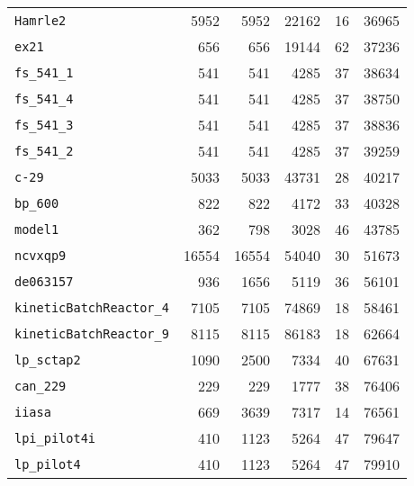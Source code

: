 \begin{table}[p]
\begin{center}
\begin{tabular}{lrrrrr}
\texttt{Hamrle2}&5952&5952&22162&16&36965\\
\texttt{ex21}&656&656&19144&62&37236\\
\texttt{fs\_541\_1}&541&541&4285&37&38634\\
\texttt{fs\_541\_4}&541&541&4285&37&38750\\
\texttt{fs\_541\_3}&541&541&4285&37&38836\\
\texttt{fs\_541\_2}&541&541&4285&37&39259\\
\texttt{c-29}&5033&5033&43731&28&40217\\
\texttt{bp\_600}&822&822&4172&33&40328\\
\texttt{model1}&362&798&3028&46&43785\\
\texttt{ncvxqp9}&16554&16554&54040&30&51673\\
\texttt{de063157}&936&1656&5119&36&56101\\
\texttt{kineticBatchReactor\_4}&7105&7105&74869&18&58461\\
\texttt{kineticBatchReactor\_9}&8115&8115&86183&18&62664\\
\texttt{lp\_sctap2}&1090&2500&7334&40&67631\\
\texttt{can\_229}&229&229&1777&38&76406\\
\texttt{iiasa}&669&3639&7317&14&76561\\
\texttt{lpi\_pilot4i}&410&1123&5264&47&79647\\
\texttt{lp\_pilot4}&410&1123&5264&47&79910\\
\hline
\end{tabular}
\end{center}
\end{table}
